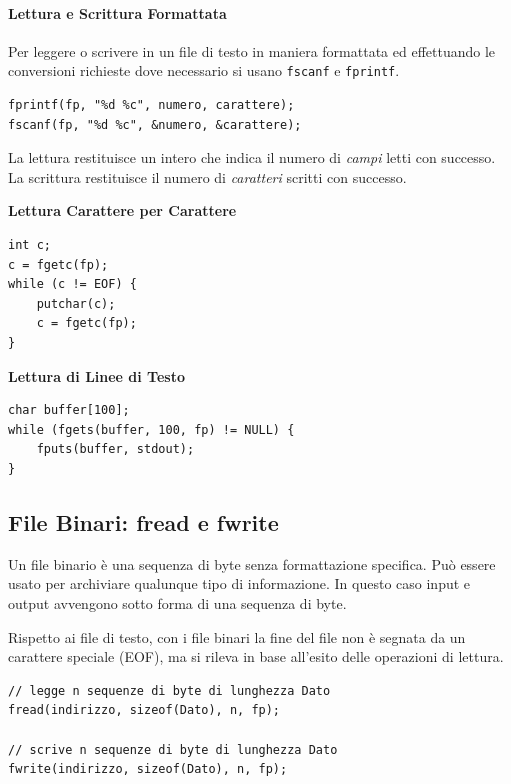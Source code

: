 \documentclass[oneside]{scrbook}
\begin{document}
\paragraph{Lettura e Scrittura Formattata}

Per leggere o scrivere in un file di testo in maniera formattata ed effettuando
le conversioni richieste dove necessario si usano \texttt{fscanf} e \texttt{fprintf}.

\begin{lstlisting}[style=cstyle]
fprintf(fp, "%d %c", numero, carattere);
fscanf(fp, "%d %c", &numero, &carattere);
\end{lstlisting}

La lettura restituisce un intero che indica il numero di \emph{campi} letti con successo.
La scrittura restituisce il numero di \emph{caratteri} scritti con successo.

\textbf{Lettura Carattere per Carattere}

\begin{lstlisting}[style=cstyle]
int c;
c = fgetc(fp);
while (c != EOF) {
    putchar(c);
    c = fgetc(fp);
}
\end{lstlisting}

\textbf{Lettura di Linee di Testo}

\begin{lstlisting}[style=cstyle]
char buffer[100];
while (fgets(buffer, 100, fp) != NULL) {
    fputs(buffer, stdout);
}
\end{lstlisting}

\subsection{File Binari: fread e fwrite}
Un file binario è una sequenza di byte senza formattazione specifica.
Può essere usato per archiviare qualunque tipo di informazione. In questo caso input e output
avvengono sotto forma di una sequenza di byte.

Rispetto ai file di testo, con i file binari la fine del file non è segnata da un carattere speciale (EOF), ma 
si rileva in base all'esito delle operazioni di lettura.

\begin{lstlisting}[style=cstyle]
// legge n sequenze di byte di lunghezza Dato
fread(indirizzo, sizeof(Dato), n, fp); 

// scrive n sequenze di byte di lunghezza Dato
fwrite(indirizzo, sizeof(Dato), n, fp);
\end{lstlisting}
\end{document}

